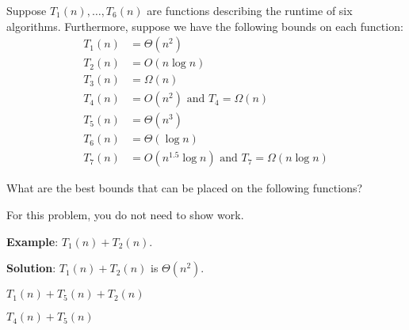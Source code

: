 \begin{prob}

    Suppose $T_1(n), \ldots, T_6(n)$ are functions
    describing the runtime of six algorithms. Furthermore, suppose we
    have the following bounds on each function:
    \begin{align*}
        T_1(n) &= \Theta(n^2)\\
        T_2(n) &= O(n \log n)\\
        T_3(n) &= \Omega(n)\\
        T_4(n) &= O(n^2) \text{ and } T_4 = \Omega(n)\\
        T_5(n) &= \Theta(n^3)\\
        T_6(n) &= \Theta(\log{n})\\
        T_7(n) &= O(n^{1.5} \log n) \text{ and } T_7 = \Omega(n \log{n})
    \end{align*}

    What are the best bounds that can be placed on the following functions?
    
    For this problem, you do not need to show work.

    

    \textbf{Example}: $T_1(n) + T_2(n)$.

    \textbf{Solution}: $T_1(n) + T_2(n)$ is $\Theta(n^2)$.


    \begin{subprobset}

        \begin{subprob}
            $T_1(n) + T_5(n) + T_2(n)$

            \begin{soln}
            
            \end{soln}
        \end{subprob}

        \begin{subprob}
            $T_4(n) + T_5(n)$

            \begin{soln}
            
            \end{soln}
        \end{subprob}


\end{subprobset}
\end{prob}
